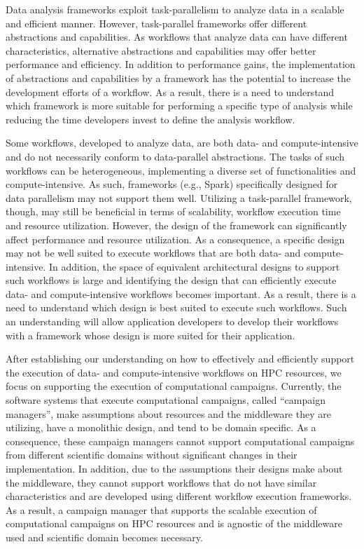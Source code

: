 Data analysis frameworks exploit task-parallelism to analyze data in a scalable
and efficient manner. However, task-parallel frameworks offer different
abstractions and capabilities. As workflows that analyze data can have different
characteristics, alternative abstractions and capabilities may offer better
performance and efficiency. In addition to performance gains, the implementation
of abstractions and capabilities by a framework has the potential to increase
the development efforts of a workflow. As a result, there is a need to
understand which framework is more suitable for performing a specific type of
analysis while reducing the time developers invest to define the analysis
workflow.

Some workflows, developed to analyze data, are both data- and compute-intensive
and do not necessarily conform to data-parallel abstractions. The tasks of such
workflows can be heterogeneous, implementing a diverse set of functionalities
and compute-intensive. As such, frameworks (e.g., Spark) specifically designed
for data parallelism may not support them well. Utilizing a task-parallel
framework, though, may still be beneficial in terms of scalability, workflow
execution time and resource utilization. However, the design of the framework
can significantly affect performance and resource utilization. As a
consequence, a specific design may not be well suited to execute workflows that
are both data- and compute-intensive. In addition, the space of equivalent
architectural designs to support such workflows is large and identifying the
design that can efficiently execute data- and compute-intensive workflows
becomes important. As a result, there is a need to understand which design is
best suited to execute such workflows. Such an understanding will allow
application developers to develop their workflows with a framework whose design
is more suited for their application.

After establishing our understanding on how to effectively and efficiently
support the execution of data- and compute-intensive workflows on HPC resources,
we focus on supporting the execution of computational campaigns. Currently, the
software systems that execute computational campaigns, called ``campaign
managers'', make assumptions about resources and the middleware they are
utilizing, have a monolithic design, and tend to be domain specific. As a
consequence, these campaign managers cannot support computational campaigns from
different scientific domains without significant changes in their
implementation. In addition, due to the assumptions their designs make about the
middleware, they cannot support workflows that do not have similar
characteristics and are developed using different workflow execution frameworks.
As a result, a campaign manager that supports the scalable execution of
computational campaigns on HPC resources and is agnostic of the middleware used
and scientific domain becomes necessary.

